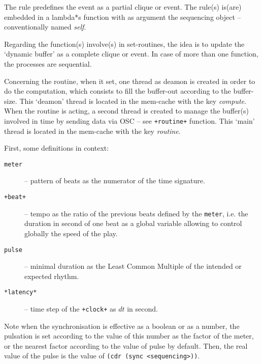 \smallskip

The rule predefines the event as a partial clique or event. The rule(s) is(are) embedded in a \glspl{lambda*} function with as argument the sequencing object -- conventionally named \textit{self}.

\smallskip
 
Regarding the function(s) involve(s) in \glspl{set-routine}, the idea is to update the `dynamic buffer' as a complete clique or event. In case of more than one function, the processes are sequential. 

\smallskip

Concerning the routine, when it set, one thread as deamon is created in order to do the computation, which consists to fill the buffer-out according to the buffer-size. This `deamon' thread is located in the mem-cache with the key \textsl{compute}. When the routine is acting, a second thread is created to manage the buffer(s) involved in time by sending data via OSC -- see \texttt{+routine+} function. This `main' thread is located in the mem-cache with the key \textsl{routine}.

\bigskip
\bigskip

{}

\bigskip

First, some definitions in context:
\begin{description}
\item[\texttt{meter}] -- pattern of beats as the numerator of the time signature.
\item[\texttt{+beat+}] -- tempo as the ratio of the previous beats defined by the \texttt{meter}, i.e. the duration in second of one beat as a global variable allowing to control globally the speed of the play.
\item[\texttt{pulse}] -- minimal duration as the Least Common Multiple of the intended or expected rhythm.
\item[\texttt{*latency*}] -- time step of the \texttt{+clock+} as $dt$ in second.
\end{description}
   
   \smallskip
   
Note when the synchronisation is effective as a boolean or as a number, the pulsation is set according to the value of this number as the factor of the meter, or the nearest factor according to the value of pulse by default. Then, the real value of the pulse is the value of \texttt{(cdr (sync <sequencing>))}.  

